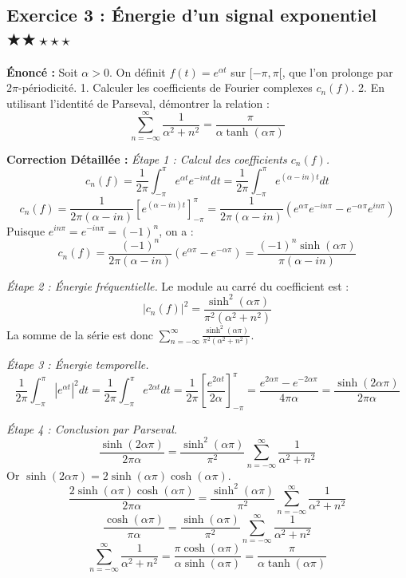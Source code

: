 \documentclass[11pt,a4paper]{article}
\begin{document}
\vspace{1cm}
\subsection*{Exercice 3 : Énergie d'un signal exponentiel $\bigstar\bigstar\star\star\star$}

\textbf{Énoncé :} Soit $\alpha > 0$. On définit $f(t) = e^{\alpha t}$ sur $[-\pi, \pi[$, que l'on prolonge par $2\pi$-périodicité.
1. Calculer les coefficients de Fourier complexes $c_n(f)$.
2. En utilisant l'identité de Parseval, démontrer la relation :
   $$\sum_{n=-\infty}^\infty \frac{1}{\alpha^2 + n^2} = \frac{\pi}{\alpha \tanh(\alpha \pi)}$$

\textbf{Correction Détaillée :}
\textit{Étape 1 : Calcul des coefficients $c_n(f)$.}
$$c_n(f) = \frac{1}{2\pi} \int_{-\pi}^\pi e^{\alpha t} e^{-int} dt = \frac{1}{2\pi} \int_{-\pi}^\pi e^{(\alpha - in)t} dt$$
$$c_n(f) = \frac{1}{2\pi (\alpha - in)} \left[ e^{(\alpha - in)t} \right]_{-\pi}^\pi = \frac{1}{2\pi (\alpha - in)} (e^{\alpha \pi} e^{-in\pi} - e^{-\alpha \pi} e^{in\pi})$$
Puisque $e^{in\pi} = e^{-in\pi} = (-1)^n$, on a :
$$c_n(f) = \frac{(-1)^n}{2\pi (\alpha - in)} (e^{\alpha \pi} - e^{-\alpha \pi}) = \frac{(-1)^n \sinh(\alpha \pi)}{\pi (\alpha - in)}$$

\textit{Étape 2 : Énergie fréquentielle.}
Le module au carré du coefficient est :
$$|c_n(f)|^2 = \frac{\sinh^2(\alpha \pi)}{\pi^2 (\alpha^2 + n^2)}$$
La somme de la série est donc $\sum_{n=-\infty}^\infty \frac{\sinh^2(\alpha \pi)}{\pi^2 (\alpha^2 + n^2)}$.

\textit{Étape 3 : Énergie temporelle.}
$$\frac{1}{2\pi} \int_{-\pi}^\pi |e^{\alpha t}|^2 dt = \frac{1}{2\pi} \int_{-\pi}^\pi e^{2\alpha t} dt = \frac{1}{2\pi} \left[ \frac{e^{2\alpha t}}{2\alpha} \right]_{-\pi}^\pi = \frac{e^{2\alpha \pi} - e^{-2\alpha \pi}}{4\pi \alpha} = \frac{\sinh(2\alpha \pi)}{2\pi \alpha}$$

\textit{Étape 4 : Conclusion par Parseval.}
$$\frac{\sinh(2\alpha \pi)}{2\pi \alpha} = \frac{\sinh^2(\alpha \pi)}{\pi^2} \sum_{n=-\infty}^\infty \frac{1}{\alpha^2 + n^2}$$
Or $\sinh(2\alpha \pi) = 2 \sinh(\alpha \pi) \cosh(\alpha \pi)$.
$$\frac{2 \sinh(\alpha \pi) \cosh(\alpha \pi)}{2\pi \alpha} = \frac{\sinh^2(\alpha \pi)}{\pi^2} \sum_{n=-\infty}^\infty \frac{1}{\alpha^2 + n^2}$$
$$\frac{\cosh(\alpha \pi)}{\pi \alpha} = \frac{\sinh(\alpha \pi)}{\pi^2} \sum_{n=-\infty}^\infty \frac{1}{\alpha^2 + n^2}$$
$$\sum_{n=-\infty}^\infty \frac{1}{\alpha^2 + n^2} = \frac{\pi \cosh(\alpha \pi)}{\alpha \sinh(\alpha \pi)} = \frac{\pi}{\alpha \tanh(\alpha \pi)}$$
\end{document}
